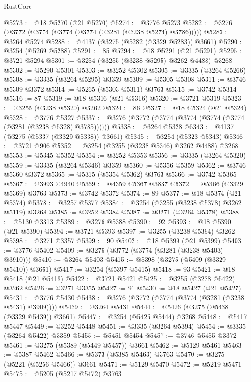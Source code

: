 \begin{lexlean}{RustCore}
\begin{coremodule}
@5273 := @18 @5270 (@21 @5270)
@5274 := @3776 @5273
@5282 := @3276 (@3772 (@3774 (@3774 (@3774 (@3281 (@3238 @5274) @3786)))))
@5283 := @3264 @5274
@5288 := @4137 (@3275 (@5282 (@3329 @5283)) @3661)
@5290 := @3254 (@5269 @5288)
@5291 := 85
@5294 := @18 @5291 (@21 @5291)
@5295 := @3721 @5294
@5301 := @3254 (@3255 (@3238 @5295) @3262 @4488) @3268
@5302 := @5290 @5301
@5303 := @3252 @5302
@5305 := @3335 (@3264 @5266)
@5308 := @3335 (@3264 @5295) @3359
@5309 := @5305 @5308
@5311 := @3746 @5309 @3372
@5314 := @5265 (@5303 @5311) @3763
@5315 := @3742 @5314
@5316 := 87
@5319 := @18 @5316 (@21 @5316)
@5320 := @3721 @5319
@5323 := @3255 (@3238 @5320) @3262
@5324 := 86
@5327 := @18 @5324 (@21 @5324)
@5328 := @3776 @5327
@5337 := @3276 (@3772 (@3774 (@3774 (@3774 (@3774 (@3281 (@3238 @5328) @3785))))))
@5338 := @3264 @5328
@5343 := @4137 (@3275 (@5337 (@3329 @5338)) @3661)
@5345 := @3254 (@5323 @5343)
@5346 := @3721 @906
@5352 := @3254 (@3255 (@3238 @5346) @3262 @4488) @3268
@5353 := @5345 @5352
@5354 := @3252 @5353
@5356 := @3335 (@3264 @5320)
@5359 := @3335 (@3264 @5346) @3359
@5360 := @5356 @5359
@5362 := @3746 @5360 @3372
@5365 := @5315 (@5354 @5362) @3763
@5366 := @3742 @5365
@5367 := @3993 @4940
@5369 := @4359 @5367 @3837
@5372 := @5366 (@3329 @5369) @3763
@5373 := @3742 @5372
@5374 := 89
@5377 := @18 @5374 (@21 @5374)
@5378 := @3257 @5377
@5384 := @3254 (@3255 (@3238 @5378) @3262 @5119) @3268
@5385 := @3252 @5384
@5387 := @3271 (@3264 @5378)
@5388 := @5130 @3313
@5389 := @3276 @5388
@5390 := 92
@5393 := @18 @5390 (@21 @5390)
@5394 := @3721 @5393
@5397 := @3255 (@3238 @5394) @3262
@5398 := @3271 @3357
@5399 := 90
@5402 := @18 @5399 (@21 @5399)
@5403 := @3776 @5402
@5409 := @3276 (@3772 (@3774 (@3281 (@3238 @5403) @3910)))
@5410 := @3264 @5403
@5415 := @5398 (@3275 (@5409 (@3329 @5410)) @3661)
@5417 := @3254 (@5397 @5415)
@5418 := 93
@5421 := @18 @5418 (@21 @5418)
@5422 := @3721 @5421
@5425 := @3255 (@3238 @5422) @3262
@5426 := @3271 @3355
@5427 := 91
@5430 := @18 @5427 (@21 @5427)
@5431 := @3776 @5430
@5438 := @3276 (@3772 (@3774 (@3774 (@3281 (@3238 @5431) @3909))))
@5439 := @3264 @5431
@5444 := @5426 (@3275 (@5438 (@3329 @5439)) @3661)
@5447 := @3254 (@5425 @5444) @3268
@5448 := @5417 @5447
@5449 := @3252 @5448
@5451 := @3335 (@3264 @5394)
@5454 := @3335 (@3264 @5422) @3359
@5455 := @5451 @5454
@5457 := @3746 @5455 @3372
@5461 := @3275 (@5389 (@5449 @5457)) @3661
@5462 := @5129 @5461
@5463 := @5387 @5462
@5466 := @5373 (@5385 @5463) @3763
@5470 := @3275 (@5221 (@5256 @5466)) @3661
@5471 := @5129 @5470
@5472 := @5219 @5471
@5475 := @5205 (@5217 @5472) @3763

\end{coremodule}
\end{lexlean}
